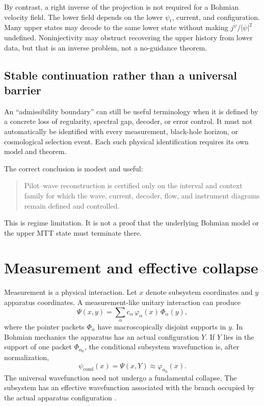 \documentclass[11pt]{article}
\theoremstyle{definition}
\theoremstyle{remark}
\begin{document}
By contrast, a right inverse of the projection is not required for a
Bohmian velocity field.  The lower field depends on the lower
\(\psi_t\), current, and configuration.  Many upper states may decode to the
same lower state without making \(j^\psi/|\psi|^2\) undefined.  Noninjectivity
may obstruct recovering the upper history from lower data, but that is an
inverse problem, not a no-guidance theorem.

\subsection{Stable continuation rather than a universal barrier}

An ``admissibility boundary'' can still be useful terminology when it is
defined by a concrete loss of regularity, spectral gap, decoder, or error
control.  It must not automatically be identified with every measurement,
black-hole horizon, or cosmological selection event.  Each such physical
identification requires its own model and theorem.

The correct conclusion is modest and useful:
\begin{quote}
Pilot--wave reconstruction is certified only on the interval and context
family for which the wave, current, decoder, flow, and instrument diagrams
remain defined and controlled.
\end{quote}
This is regime limitation.  It is not a proof that the underlying Bohmian
model or the upper MTT state must terminate there.

\section{Measurement and effective collapse}
\label{sec:measurement}

Measurement is a physical interaction.  Let \(x\) denote subsystem
coordinates and \(y\) apparatus coordinates.  A measurement-like unitary
interaction can produce
\begin{equation}
\Psi(x,y)
=
\sum_\alpha c_\alpha\,
\varphi_\alpha(x)\,\Phi_\alpha(y),
\label{eq:measurement-state}
\end{equation}
where the pointer packets \(\Phi_\alpha\) have macroscopically disjoint
supports in \(y\).  In Bohmian mechanics the apparatus has an actual
configuration \(Y\).  If \(Y\) lies in the support of one packet
\(\Phi_{\alpha_0}\), the conditional subsystem wavefunction is, after
normalization,
\[
\psi_{\mathrm{cond}}(x)=\Psi(x,Y)
\approx\varphi_{\alpha_0}(x).
\]
The universal wavefunction need not undergo a fundamental collapse.  The
subsystem has an effective wavefunction associated with the branch occupied
by the actual apparatus configuration
\cite{DurrGoldsteinZanghi1992}.
\end{document}
